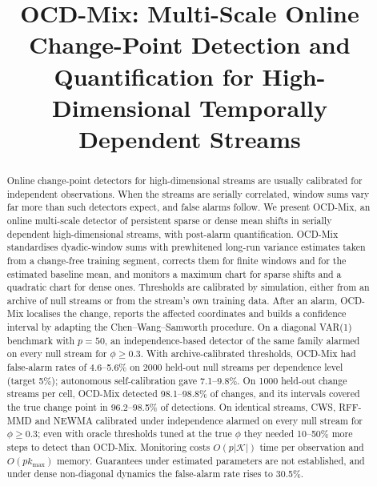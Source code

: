 \documentclass[conference]{IEEEtran}
\begin{document}
\title{OCD-Mix: Multi-Scale Online Change-Point Detection and Quantification for High-Dimensional Temporally Dependent Streams}

\author{
\and
{}
}

\maketitle

\begin{abstract}
Online change-point detectors for high-dimensional streams are usually calibrated for independent observations. When the streams are serially correlated, window sums vary far more than such detectors expect, and false alarms follow. We present OCD-Mix, an online multi-scale detector of persistent sparse or dense mean shifts in serially dependent high-dimensional streams, with post-alarm quantification. OCD-Mix standardises dyadic-window sums with prewhitened long-run variance estimates taken from a change-free training segment, corrects them for finite windows and for the estimated baseline mean, and monitors a maximum chart for sparse shifts and a quadratic chart for dense ones. Thresholds are calibrated by simulation, either from an archive of null streams or from the stream's own training data. After an alarm, OCD-Mix localises the change, reports the affected coordinates and builds a confidence interval by adapting the Chen--Wang--Samworth procedure. On a diagonal VAR(1) benchmark with $p=50$, an independence-based detector of the same family alarmed on every null stream for $\phi\ge 0.3$. With archive-calibrated thresholds, OCD-Mix had false-alarm rates of 4.6--5.6\% on 2000 held-out null streams per dependence level (target 5\%); autonomous self-calibration gave 7.1--9.8\%. On 1000 held-out change streams per cell, OCD-Mix detected 98.1--98.8\% of changes, and its intervals covered the true change point in 96.2--98.5\% of detections. On identical streams, CWS, RFF-MMD and NEWMA calibrated under independence alarmed on every null stream for $\phi\ge 0.3$; even with oracle thresholds tuned at the true $\phi$ they needed 10--50\% more steps to detect than OCD-Mix. Monitoring costs $O(p|\mathcal{K}|)$ time per observation and $O(pk_{\max})$ memory. Guarantees under estimated parameters are not established, and under dense non-diagonal dynamics the false-alarm rate rises to 30.5\%.
\end{abstract}
\end{document}
